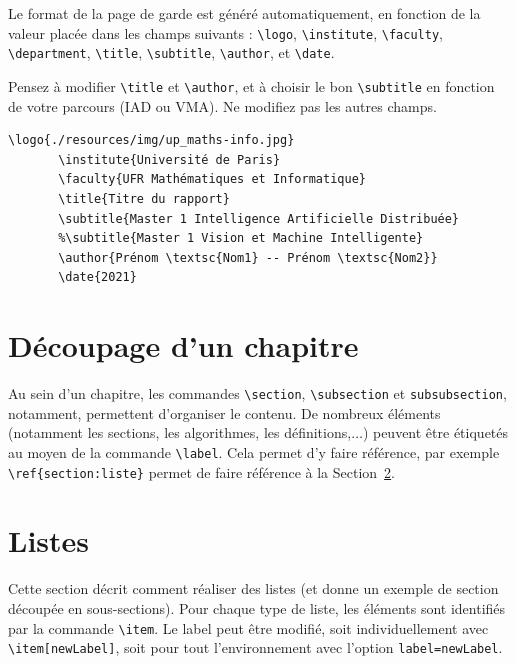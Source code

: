 \documentclass[a4paper, 12pt]{report}
\begin{document}
    
    Le format de la page de garde est généré automatiquement, en fonction de la valeur placée dans les champs suivants : \verb+\logo+, \verb+\institute+, \verb+\faculty+, \verb+\department+, \verb+\title+, \verb+\subtitle+, \verb+\author+, et \verb+\date+.

    Pensez à modifier \verb+\title+ et \verb+\author+, et à choisir le bon \verb+\subtitle+ en fonction de votre parcours (IAD ou VMA). Ne modifiez pas les autres champs.

    \begin{lstlisting}[style=latexFrameTB, caption={Code \LaTeX{} de la page de garde},gobble=7]
       \logo{./resources/img/up_maths-info.jpg}
       \institute{Université de Paris}
       \faculty{UFR Mathématiques et Informatique}
       \title{Titre du rapport}
       \subtitle{Master 1 Intelligence Artificielle Distribuée}
       %\subtitle{Master 1 Vision et Machine Intelligente}
       \author{Prénom \textsc{Nom1} -- Prénom \textsc{Nom2}}
       \date{2021}
    \end{lstlisting}

    
    \section{Découpage d'un chapitre}
    Au sein d'un chapitre, les commandes \verb+\section+, \verb+\subsection+ et \verb+subsubsection+, notamment, permettent d'organiser le contenu. De nombreux éléments (notamment les sections, les algorithmes, les définitions,$\dots$) peuvent être étiquetés au moyen de la commande \verb+\label+. Cela permet d'y faire référence, par exemple \verb+\ref{section:liste}+ permet de faire référence à la Section~\ref{section:liste}.
    
    \section{Listes}\label{section:liste}
    Cette section décrit comment réaliser des listes (et donne un exemple de section découpée en sous-sections). Pour chaque type de liste, les éléments sont identifiés par la commande \verb+\item+. Le label peut être modifié, soit individuellement avec \verb+\item[newLabel]+, soit pour tout l'environnement avec l'option \verb+label=newLabel+.
    
\end{document}
